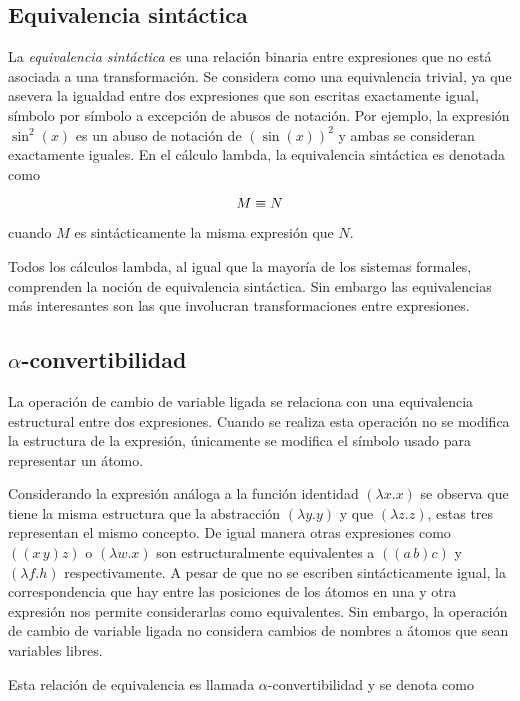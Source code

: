 \subsection{Equivalencia sintáctica}
\label{sec:equivalencia-sintactica}

La \emph{equivalencia sintáctica} es una relación binaria entre expresiones que no está asociada a una transformación. Se considera como una equivalencia trivial, ya que asevera la igualdad entre dos expresiones que son escritas exactamente igual, símbolo por símbolo a excepción de abusos de notación. Por ejemplo, la expresión \( \sin^{2}(x) \) es un abuso de notación de \( \left( \sin(x) \right)^{2} \) y ambas se consideran exactamente iguales. En el cálculo lambda, la equivalencia sintáctica es denotada como

\[ M \equiv N \]

cuando \( M \) es sintácticamente la misma expresión que \( N \).

Todos los cálculos lambda, al igual que la mayoría de los sistemas formales, comprenden la noción de equivalencia sintáctica. Sin embargo las equivalencias más interesantes son las que involucran transformaciones entre expresiones.

\subsection{\( α \)-convertibilidad}
\label{sec:alfa-convertibilidad}

La operación de cambio de variable ligada se relaciona con una equivalencia estructural entre dos expresiones. Cuando se realiza esta operación no se modifica la estructura de la expresión, únicamente se modifica el símbolo usado para representar un átomo.

Considerando la expresión análoga a la función identidad \( (λx.x) \) se observa que tiene la misma estructura que la abstracción \( (λy.y) \) y que \( (λz.z) \), estas tres representan el mismo concepto. De igual manera otras expresiones como \( ((x\, y)z) \) o \( (λw.x) \) son estructuralmente equivalentes a \( ((a\, b)c) \) y \( (λf.h) \) respectivamente. A pesar de que no se escriben sintácticamente igual, la correspondencia que hay entre las posiciones de los átomos en una y otra expresión nos permite considerarlas como equivalentes. Sin embargo, la operación de cambio de variable ligada no considera cambios de nombres a átomos que sean variables libres.

Esta relación de equivalencia es llamada \( α \)-convertibilidad y se denota como

